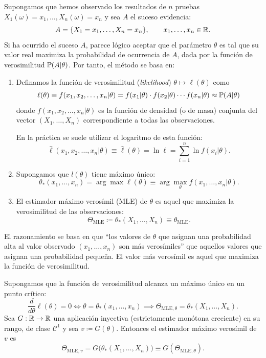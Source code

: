 Supongamos que hemos observado los resultados de $n$ pruebas $X_1(\omega) = x_1, \dots, X_n(\omega) = x_n$ y sea $A$ el suceso evidencia:
\[
  A = \{X_1 = x_1, \dots, X_n = x_n\}, \qquad x_1, \dots, x_n \in \mathbb{R}.
\]
Si ha ocurrido el suceso $A$, parece lógico aceptar que el parámetro $\theta$ es tal que su valor real maximiza la probabilidad de ocurrencia de $A$, dada por la función de verosimilitud $\mathbb{P}(A|\theta)$. Por tanto, el método se basa en:
\begin{enumerate}
  \item Definamos la función de verosimilitud (\emph{likelihood}) $\theta \mapsto \ell(\theta)$ como
  \[
    \ell(\theta) \equiv f(x_1, x_2, \dots, x_n|\theta) = f(x_1|\theta) \cdot f(x_2|\theta) \cdots f(x_n|\theta) \approx \mathbb{P}(A|\theta)
  \]
  donde $f(x_1, x_2, \dots, x_n|\theta)$ es la función de densidad (o de masa) conjunta del vector $(X_1, \dots, X_n)$ correspondiente a todas las observaciones.

  En la práctica se suele utilizar el logaritmo de esta función:
  \[
    \hat{\ell}(x_1, x_2, \dots, x_n|\theta) \equiv \hat{\ell}(\theta) = \ln \ell = \sum_{i=1}^n \ln f(x_i|\theta).
  \]

  \item Supongamos que $l(\theta)$ tiene máximo único:
  \[
    \theta_*(x_1, \dots, x_n) = \arg\max \ell(\theta) \equiv \arg\max_\theta f(x_1, \dots, x_n|\theta).
  \]

  \item El estimador máximo verosímil (MLE) de $\theta$ es aquel que maximiza la verosimilitud de las observaciones:
  \[
    \Theta_{\text{MLE}} \coloneqq \theta_*(X_1, \dots, X_n) \equiv \theta_{\text{MLE}}.
  \]
\end{enumerate}

El razonamiento se basa en que ``los valores de $\theta$ que asignan una probabilidad alta al valor observado $(x_1, \dots, x_n)$ son más verosímiles'' que aquellos valores que asignan una probabilidad pequeña. El valor más verosímil es aquel que maximiza la función de verosimilitud.

\begin{proposicion}[1 --- Invariancia]
Supongamos que la función de verosimilitud alcanza un máximo único en un punto crítico:
\[
  \frac{d}{d\theta} \ell(\theta) = 0 \iff \theta = \theta_*(x_1, \dots, x_n) \implies \Theta_{\text{MLE}, \theta} = \theta_*(X_1, \dots, X_n).
\]
Sea $G : \mathbb{R} \to \mathbb{R}$ una aplicación inyectiva (estrictamente monótona creciente) en su rango, de clase $\mathcal{C}^1$ y sea $v \coloneqq G(\theta)$. Entonces el estimador máximo verosímil de $v$ es
\[
  \Theta_{\text{MLE}, v} = G\bigl(\theta_*(X_1, \dots, X_n)\bigr) \equiv G(\Theta_{\text{MLE}, \theta}).
\]
\end{proposicion}

